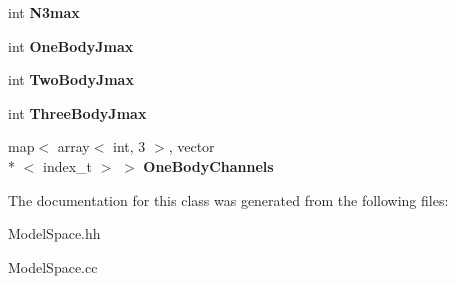 \begin{DoxyCompactItemize}
\item 
\hypertarget{classModelSpace_ab28d5ba1838ef9d91a3f7c570530ca7c}{int {\bfseries N3max}}\label{classModelSpace_ab28d5ba1838ef9d91a3f7c570530ca7c}

\item 
\hypertarget{classModelSpace_a4c8f0a4476a3b3da3fced59d899f0134}{int {\bfseries One\-Body\-Jmax}}\label{classModelSpace_a4c8f0a4476a3b3da3fced59d899f0134}

\item 
\hypertarget{classModelSpace_aa2fd94965eb8a508e5ea7d4c879bae0b}{int {\bfseries Two\-Body\-Jmax}}\label{classModelSpace_aa2fd94965eb8a508e5ea7d4c879bae0b}

\item 
\hypertarget{classModelSpace_af9ca130d96f582d0ed1a4ef5373bcd05}{int {\bfseries Three\-Body\-Jmax}}\label{classModelSpace_af9ca130d96f582d0ed1a4ef5373bcd05}

\item 
\hypertarget{classModelSpace_add00e0a37f8597748f903dffb1c5b2a5}{map$<$ array$<$ int, 3 $>$, vector\\*
$<$ index\-\_\-t $>$ $>$ {\bfseries One\-Body\-Channels}}\label{classModelSpace_add00e0a37f8597748f903dffb1c5b2a5}

\end{DoxyCompactItemize}


The documentation for this class was generated from the following files\-:\begin{DoxyCompactItemize}
\item 
Model\-Space.\-hh\item 
Model\-Space.\-cc\end{DoxyCompactItemize}
